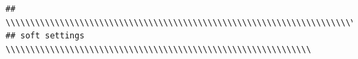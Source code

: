 \documentclass[11pt, a4paper, oneside, twocolumn]{report}
\begin{document}
\begin{verbatim}
## \\\\\\\\\\\\\\\\\\\\\\\\\\\\\\\\\\\\\\\\\\\\\\\\\\\\\\\\\\\\\\\\\\\\\\\\\\\
## soft settings \\\\\\\\\\\\\\\\\\\\\\\\\\\\\\\\\\\\\\\\\\\\\\\\\\\\\\\\\\\\\\

\end{verbatim}
\end{document}
